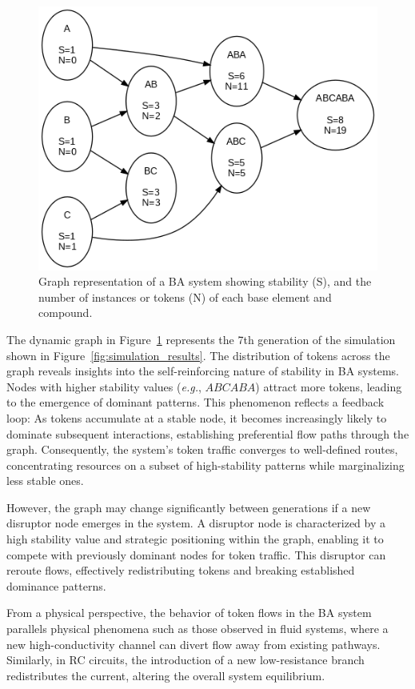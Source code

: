 \documentclass[entropy,article,submit,pdftex,moreauthors]{Definitions/mdpi}
\begin{document}
\begin{figure}[h]
    \centering
    \includegraphics[width=0.7\linewidth]{abc_graph.png}
    \caption{Graph representation of a BA system showing stability (S), and the number of instances or tokens (N) of each base element and compound.}
    \label{fig:abc_sim}
\end{figure}

The dynamic graph in Figure~\ref{fig:abc_sim} represents the 7th generation of the simulation shown in Figure~\ref{fig:simulation_results}. The distribution of tokens across the graph reveals insights into the self-reinforcing nature of stability in BA systems. Nodes with higher stability values (\textit{e.g.}, $ABCABA$) attract more tokens, leading to the emergence of dominant patterns. This phenomenon reflects a feedback loop: As tokens accumulate at a stable node, it becomes increasingly likely to dominate subsequent interactions, establishing preferential flow paths through the graph. Consequently, the system's token traffic converges to well-defined routes, concentrating resources on a subset of high-stability patterns while marginalizing less stable ones.

However, the graph may change significantly between generations if a new disruptor node emerges in the system. A disruptor node is characterized by a high stability value and strategic positioning within the graph, enabling it to compete with previously dominant nodes for token traffic. This disruptor can reroute flows, effectively redistributing tokens and breaking established dominance patterns. 

From a physical perspective, the behavior of token flows in the BA system parallels physical phenomena such as those observed in fluid systems, where a new high-conductivity channel can divert flow away from existing pathways. Similarly, in RC circuits, the introduction of a new low-resistance branch redistributes the current, altering the overall system equilibrium. 
\end{document}
